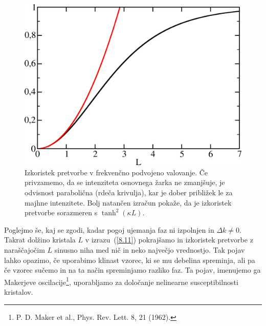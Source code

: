 \begin{figure}[h]
\centering
\includegraphics[width=8truecm]{slike/08_shg_depletion.png}
\caption{Izkoristek pretvorbe v frekvenčno podvojeno valovanje. Če privzamemo, da se
intenziteta osnovnega žarka ne zmanjšuje, je odvisnost parabolična (rdeča krivulja), kar 
je dober približek le za majhne intenzitete. Bolj natančen izračun pokaže, da je izkoristek 
pretvorbe sorazmeren s $\tanh^2(\kappa L)$.}
\label{fig:shg2dep}
\end{figure}

Poglejmo še, kaj se zgodi, kadar pogoj ujemanja faz ni izpolnjen in 
 $\Delta k \neq 0$. Takrat dolžino kristala $L$ v izrazu~(\ref{8.11})
pokrajšamo in izkoristek pretvorbe z naraščajočim
$L$ sinusno niha med nič in neko največjo vrednostjo. Tak pojav lahko opazimo, če
uporabimo klinast vzorec, ki se mu debelina spreminja, ali pa če vzorec sučemo 
in na ta način spreminjamo razliko faz. Ta pojav, imenujemo ga Makerjeve 
oscilacije\footnote{P. D. Maker et al., Phys. Rev. Lett. 8, 21 (1962).}, 
uporabljamo za določanje nelinearne susceptibilnosti kristalov.


